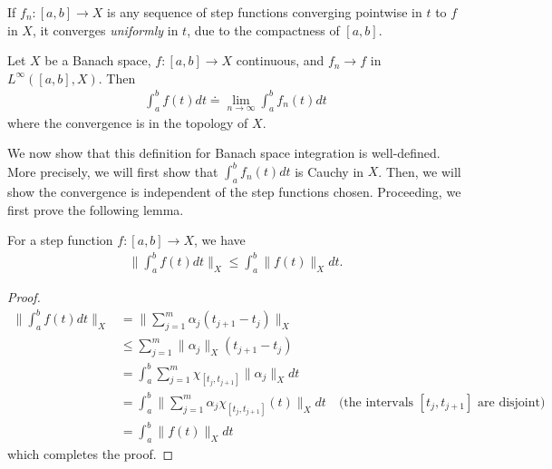 %
\begin{framed}
\begin{remark}
  \label{rem:unif}
If $f_{n}: [a,b] \to X$ is any sequence of step functions converging pointwise
in $t$ to $f$ in $X$, it converges \emph{uniformly} in $t$, due to the
compactness of $[a,b]$. 
\end{remark}
\end{framed}
%
\begin{definition}
  \label{def:banach}
  Let $X$ be a Banach space, $f: [a,b] \to X$ continuous, and $f_{n} \to f$ in
  $L^{\infty}([a,b], X)$. Then 
  \begin{equation*}
  \begin{split}
    \int_{a}^{b} f(t) dt \doteq \lim_{n \to \infty} \int_{a}^{b} f_{n}(t) dt
  \end{split}
  \end{equation*}
%
where the convergence is in the topology of $X$. 
\end{definition}
We now show that this
definition for Banach space integration is
well-defined. More precisely, we will first show that $\int_{a}^{b}
f_{n}(t) dt$ is Cauchy in $X$. Then, we will show the convergence is independent
of the step functions chosen. Proceeding, we first prove the following lemma.
%
%
%
%
%
%
%
%
%
%
\begin{lemma}
  For a step function $f: [a,b] \to X$, we have
  \begin{equation*}
  \begin{split}
    \| \int_{a}^{b} f(t) dt \|_{X} \le \int_{a}^{b} \| f(t) \|_{X} dt.
  \end{split}
  \end{equation*}
\label{lem:tri-ineq-int}
\end{lemma}
%
%
%
%
\begin{proof}
%
%
\begin{equation*}
\begin{split}
  \| \int_{a}^{b} f(t) dt \|_{X} &
  = \| \sum_{j=1}^{m}\alpha_{j} (t_{j+1} - t_{j})
  \|_{X}
  \\
  & \le  \sum_{j=1}^{m} \| \alpha_{j} \|_{X} (t_{j+1} - t_{j})
  \\
  & = \int_{a}^{b} \sum_{j=1}^{m} \chi_{[t_{j}, t_{j+1}]} \| \alpha_{j} \|_{X} dt
  \\
  & = \int_{a}^{b} \| \sum_{j=1}^{m} \alpha_{j} \chi_{[t_{j}, t_{j+1}]}(t)
  \|_{X}dt \quad \text{(the intervals $[t_{j}, t_{j+1}]$ are disjoint)} 
  \\
  & = \int_{a}^{b} \| f(t) \|_{X} dt
\end{split}
\end{equation*}
%
which completes the proof.
%
\end{proof}
